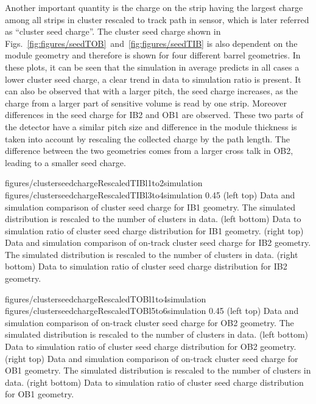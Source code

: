 Another important quantity is the charge on the strip having the largest charge among all strips in cluster rescaled to track path in sensor, which is later referred as ``cluster seed charge''. The cluster seed charge shown in Figs.~\ref{fig:figures/seedTOB}~and~\ref{fig:figures/seedTIB} is also dependent on the module geometry and therefore is shown for four different barrel geometries. In these plots, it can be seen that the simulation in average predicts in all cases a lower cluster seed charge, a clear trend in data to simulation ratio is present. It can also be observed that with a larger pitch, the seed charge increases, as the charge from a larger part of sensitive volume is read by one strip. Moreover differences in the seed charge for IB2 and OB1 are observed. These two parts of the detector have a similar pitch size and difference in the module thickness is taken into account by rescaling the collected charge by the path length. The difference between the two geometries comes from a larger cross talk in OB2, leading to a smaller seed charge.


                 {figures/clusterseedchargeRescaledTIBl1to2simulation}
                 {figures/clusterseedchargeRescaledTIBl3to4simulation} %
                 {0.45}       %
                 {(left top) Data and simulation  comparison of cluster seed charge for IB1 geometry. The simulated distribution is rescaled to the number of clusters in data. (left bottom) Data to simulation ratio of cluster seed charge distribution for IB1 geometry. (right top) Data and simulation comparison of on-track cluster seed charge for IB2 geometry. The simulated distribution is rescaled to the number of clusters in data. (right bottom) Data to simulation ratio of cluster seed charge distribution for IB2 geometry. }

                 {figures/clusterseedchargeRescaledTOBl1to4simulation}
                 {figures/clusterseedchargeRescaledTOBl5to6simulation} %
                 {0.45}       %
                 {(left top) Data and simulation comparison of on-track cluster seed charge for OB2 geometry. The simulated distribution is rescaled to the number of clusters in data. (left bottom) Data to simulation ratio of cluster seed charge distribution for OB2 geometry. (right top) Data and simulation comparison of on-track cluster seed charge for OB1 geometry. The simulated distribution is rescaled to the number of clusters in data. (right bottom) Data to simulation ratio of cluster seed charge distribution for OB1 geometry. }


